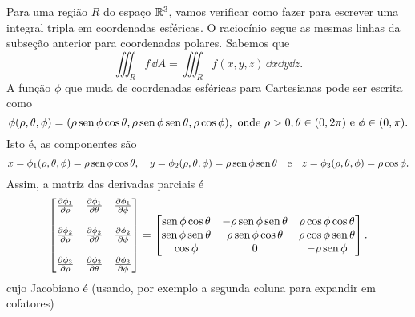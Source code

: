 \documentclass[../livro.tex]{subfiles}  %
\begin{document}
Para uma região $R$ do espaço $\mathbb{R}^3$, vamos verificar como fazer para escrever uma integral tripla em coordenadas esféricas. O raciocínio segue as mesmas linhas da subseção anterior para coordenadas polares. Sabemos que
\begin{equation}
\iiint_R f \, \dd A = \iiint_R f(x,y, z) \, \dd x \dd y  \dd z.
\end{equation} A função $\phi$ que muda de coordenadas esféricas para Cartesianas pode ser escrita como
\begin{equation}
\phi (\rho, \theta, \phi) = (\rho \operatorname{sen} \phi \cos \theta, \rho \operatorname{sen} \phi \operatorname{sen} \theta, \rho \cos \phi), \text{ onde } \rho> 0, \theta \in (0,2\pi) \text{ e } \phi \in (0, \pi).
\end{equation} Isto é, as componentes são
\begin{equation}
x = \phi_1 (\rho, \theta, \phi) = \rho \operatorname{sen} \phi \cos \theta, \quad 
y = \phi_2 (\rho, \theta, \phi) = \rho \operatorname{sen} \phi \operatorname{sen} \theta \quad \text{e} \quad 
z = \phi_3 (\rho, \theta, \phi) = \rho \cos \phi.
\end{equation} Assim, a matriz das derivadas parciais é
\begin{equation}
\begin{bmatrix}
\frac{\partial \phi_1}{\partial \rho} & \frac{\partial \phi_1}{\partial \theta} & \frac{\partial \phi_1}{\partial \phi}  \\
& & \\
\frac{\partial \phi_2}{\partial \rho} & \frac{\partial \phi_2}{\partial \theta} & \frac{\partial \phi_2}{\partial \phi} \\
& & \\
\frac{\partial \phi_3}{\partial \rho} & \frac{\partial \phi_3}{\partial \theta} & \frac{\partial \phi_3}{\partial \phi} \\
\end{bmatrix} = 
\begin{bmatrix}
\operatorname{sen} \phi \cos \theta & -\rho \operatorname{sen} \phi \operatorname{sen} \theta   & \rho \cos \phi \cos \theta \\
\operatorname{sen} \phi \operatorname{sen} \theta &  \rho \operatorname{sen} \phi \cos \theta   & \rho \cos \phi \operatorname{sen} \theta  \\
\cos \phi         &            0                  &    -\rho \operatorname{sen} \phi  \\
\end{bmatrix}.
\end{equation} cujo Jacobiano é (usando, por exemplo a segunda coluna para expandir em cofatores)
\end{document}
